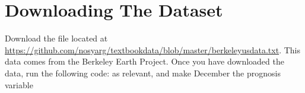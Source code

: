 \section{Downloading The Dataset}

Download the file located at \url{https://github.com/nosyarg/textbookdata/blob/master/berkeleyusdata.txt}.
This data comes from the Berkeley Earth Project.
Once you have downloaded the data, run the following code:
as relevant, and make December the prognosis variable
